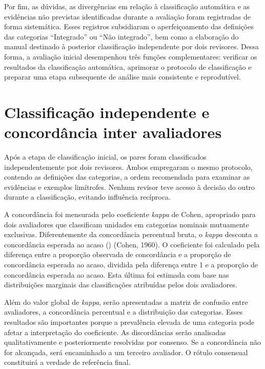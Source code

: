 Por fim, as dúvidas, as divergências em relação à classificação automática e as evidências não previstas identificadas durante a avaliação foram registradas de forma sistemática. Esses registros subsidiaram o aperfeiçoamento das definições das categorias ``Integrado'' ou ``Não integrado'', bem como a elaboração do manual destinado à posterior classificação independente por dois revisores. Dessa forma, a avaliação inicial desempenhou três funções complementares: verificar os resultados da classificação automática, aprimorar o protocolo de classificação e preparar uma etapa subsequente de análise mais consistente e reprodutível. 

\section{Classificação independente e concordância inter avaliadores}

Após a etapa de classificação inicial, os pares foram classificados independentemente por dois revisores. Ambos empregaram o mesmo protocolo, contendo as definições das categorias, a ordem recomendada para examinar as evidências e exemplos limítrofes. Nenhum revisor teve acesso à decisão do outro durante a classificação, evitando influência recíproca.

A concordância foi mensurada pelo coeficiente \textit{kappa} de Cohen, apropriado para dois avaliadores que classificam unidades em categorias nominais mutuamente exclusivas. Diferentemente da concordância percentual bruta, o \textit{kappa} desconta a concordância esperada ao acaso (\cite{cohen1960coefficient}) (Cohen, 1960). O coeficiente foi calculado pela diferença entre a proporção observada de concordância e a proporção de concordância esperada ao acaso, dividida pela diferença entre 1 e a proporção de concordância esperada ao acaso. Esta última foi estimada com base nas distribuições marginais das classificações atribuídas pelos dois avaliadores.

Além do valor global de \textit{kappa}, serão apresentadas a matriz de confusão entre avaliadores, a concordância percentual e a distribuição das categorias. Esses resultados são importantes porque a prevalência elevada de uma categoria pode afetar a interpretação do coeficiente. As discordâncias serão analisadas qualitativamente e posteriormente resolvidas por consenso. Se a concordância não for alcançada, será encaminhado a um terceiro avaliador. O rótulo consensual constituirá a verdade de referência final.



